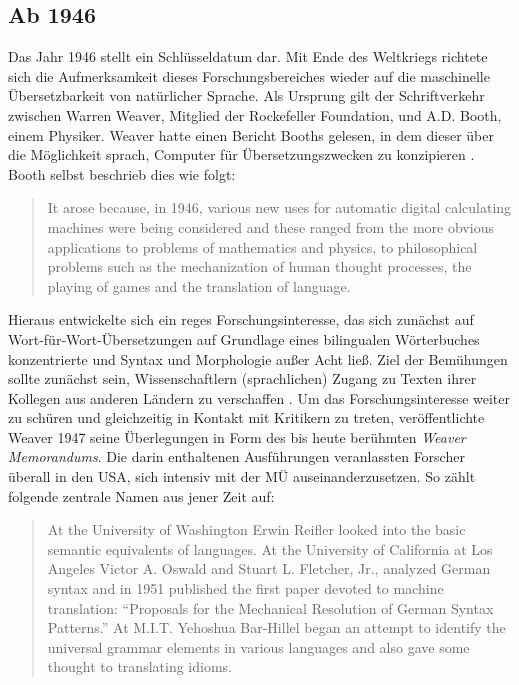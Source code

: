 \subsection{Ab 1946}
\label{K3:para:ab1946}
\begin{sloppypar}
Das Jahr 1946 stellt ein Schlüsseldatum dar. Mit Ende des Weltkriegs richtete sich die Aufmerksamkeit dieses Forschungsbereiches wieder auf die maschinelle Übersetzbarkeit von natürlicher Sprache. Als Ursprung gilt der Schriftverkehr zwischen Warren Weaver, Mitglied der Rockefeller Foundation, und A.D. Booth, einem Physiker. Weaver hatte einen Bericht Booths gelesen, in dem dieser über die Möglichkeit sprach, Computer für Übersetzungszwecken zu konzipieren \citep[29]{locke_translation_1956}. Booth selbst beschrieb dies wie folgt:
\end{sloppypar}

\begin{quote}
It arose because, in 1946, various new uses for automatic digital calculating machines were being considered and these ranged from the more obvious applications to problems of mathematics and physics, to philosophical problems such as the mechanization of human thought processes, the playing of games and the translation of language. \citep[88]{booth_history_1958}
\end{quote}


Hieraus entwickelte sich ein reges Forschungsinteresse, das sich zunächst auf Wort-für-Wort-Übersetzungen auf Grundlage eines bilingualen Wörterbuches konzentrierte und Syntax und Morphologie außer Acht ließ. Ziel der Bemühungen sollte zunächst sein, Wissenschaftlern (sprachlichen) Zugang zu Texten ihrer Kollegen aus anderen Ländern zu verschaffen \citep[28]{delavenay_introduction_1960}. Um das Forschungsinteresse weiter zu schüren und gleichzeitig in Kontakt mit Kritikern zu treten, veröffentlichte Weaver 1947 seine Überlegungen in Form des bis heute berühmten \emph{Weaver Memorandums}. Die darin enthaltenen Ausführungen veranlassten Forscher überall in den USA, sich intensiv mit der MÜ auseinanderzusetzen. So zählt \citet[30]{locke_translation_1956} folgende zentrale Namen aus jener Zeit auf:


\begin{quote}
At the University of Washington Erwin Reifler looked into the basic semantic equivalents of languages. At the University of California at Los Angeles Victor A. Oswald and Stuart L. Fletcher, Jr., analyzed German syntax and in 1951 published the first paper devoted to machine translation: “Proposals for the Mechanical Resolution of German Syntax Patterns.” At M.I.T. Yehoshua Bar-Hillel began an attempt to identify the universal grammar elements in various languages and also gave some thought to translating idioms.
\end{quote}

